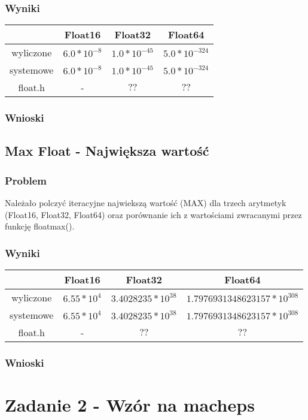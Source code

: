\documentclass[12pt, a4paper]{article}
\begin{document}
\subsubsection{Wyniki}
\begin{center}
\begin{tabular}{ c|c|c|c}
  & Float16 & Float32 & Float64\\
  \hline
 wyliczone & $6.0 * 10^{-8}$ & $1.0 * 10^{-45}$ & $5.0 * 10^{-324}$\\
 systemowe & $6.0 * 10^{-8}$ & $1.0 * 10^{-45}$ & $5.0 * 10^{-324}$\\
 float.h & - & $??$ & $??$
\end{tabular}
\end{center}
\subsubsection{Wnioski}


\subsection{Max Float - Największa wartość}
\subsubsection{Problem}
Należało polczyć iteracyjne najwiekszą wartość (MAX) dla trzech arytmetyk (Float16, Float32, Float64) oraz porównanie ich z wartościami zwracanymi przez funkcję floatmax().
\subsubsection{Wyniki}
\begin{center}
\begin{tabular}{ c|c|c|c}
  & Float16 & Float32 & Float64\\
  \hline
 wyliczone & $6.55 * 10^{4}$ & $3.4028235 * 10^{38}$ & $1.7976931348623157 * 10^{308}$\\
 systemowe & $6.55 * 10^{4}$ & $3.4028235 * 10^{38}$ & $1.7976931348623157 * 10^{308}$\\
 float.h & - & $??$ & $??$
\end{tabular}
\end{center}
\subsubsection{Wnioski}



\section{Zadanie 2 - Wzór na macheps}
\end{document}
